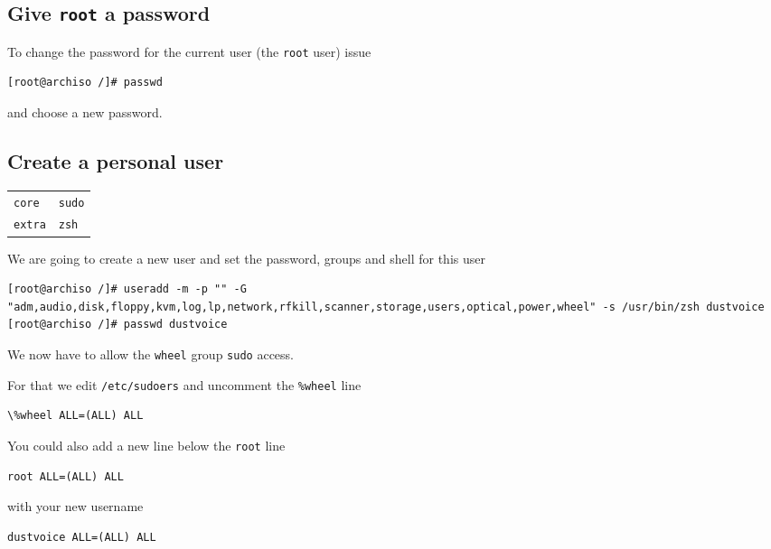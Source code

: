 \documentclass[9pt]{report}
\newenvironment{packagetable}
{\begin{longtabu}to \textwidth [b]{X[1,r]|X[1,l]}}
{\end{longtabu}}
\begin{document}
\hypertarget{x-give-root-a-password}{\subsection{Give \texttt{root} a password}}
To change the password for the current user (the \texttt{root} user) issue


\begin{verbatim}
[root@archiso /]# passwd
\end{verbatim}

and choose a new password.



\newpage

\hypertarget{x-create-a-personal-user}{\subsection{Create a personal user}}
\begin{packagetable}
    \texttt{core} & \texttt{sudo} \\ 
    \texttt{extra} & \texttt{zsh} \\ 
\end{packagetable}

We are going to create a new user and set the password, groups and shell for this user


\begin{verbatim}
[root@archiso /]# useradd -m -p "" -G "adm,audio,disk,floppy,kvm,log,lp,network,rfkill,scanner,storage,users,optical,power,wheel" -s /usr/bin/zsh dustvoice
[root@archiso /]# passwd dustvoice
\end{verbatim}

We now have to allow the \texttt{wheel} group \texttt{sudo} access.


For that we edit \texttt{/etc/sudoers} and uncomment the \texttt{\%wheel} line


\begin{verbatim}
\%wheel ALL=(ALL) ALL
\end{verbatim}

You could also add a new line below the \texttt{root} line


\begin{verbatim}
root ALL=(ALL) ALL
\end{verbatim}

with your new username


\begin{verbatim}
dustvoice ALL=(ALL) ALL
\end{verbatim}
\end{document}
